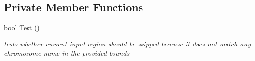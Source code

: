 \subsection*{Private Member Functions}
\begin{DoxyCompactItemize}
\item 
\hypertarget{classGenomicRegionSetScanner_a2687f9ec4d1fac4856f6fd8bf823b65d}{
bool \hyperlink{classGenomicRegionSetScanner_a2687f9ec4d1fac4856f6fd8bf823b65d}{Test} ()}
\label{classGenomicRegionSetScanner_a2687f9ec4d1fac4856f6fd8bf823b65d}

\begin{DoxyCompactList}\small\item\em tests whether current input region should be skipped because it does not match any chromosome name in the provided bounds \end{DoxyCompactList}\end{DoxyCompactItemize}
